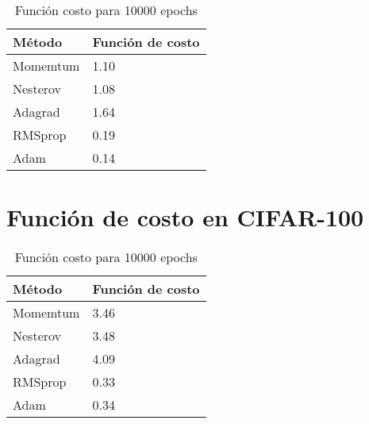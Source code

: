 \begin{table}[H]
	\centering
	\caption{Función costo para 10000 epochs}
	\label{my-label}
	\begin{centering}
		\begin{tabular}{@{}ll@{}}
			\toprule
			Método& Función de costo\\ \midrule
			Momemtum& 1.10 \\
			Nesterov& 1.08\\
			Adagrad&1.64   \\
			RMSprop& 0.19 \\
			Adam& 0.14 \\ 
		\end{tabular}
	\end{centering}
	
\end{table}

\section{Función de costo en CIFAR-100	}
\begin{table}[H]
	\centering
	\caption{Función costo para 10000 epochs}
	\label{my-label}
	\begin{centering}
		\begin{tabular}{@{}ll@{}}
			\toprule
			Método& Función de costo\\ \midrule
			Momemtum& 3.46 \\
			Nesterov& 3.48\\
			Adagrad&4.09  \\
			RMSprop& 0.33 \\
			Adam& 0.34 \\ 
		\end{tabular}
	\end{centering}
	
\end{table}